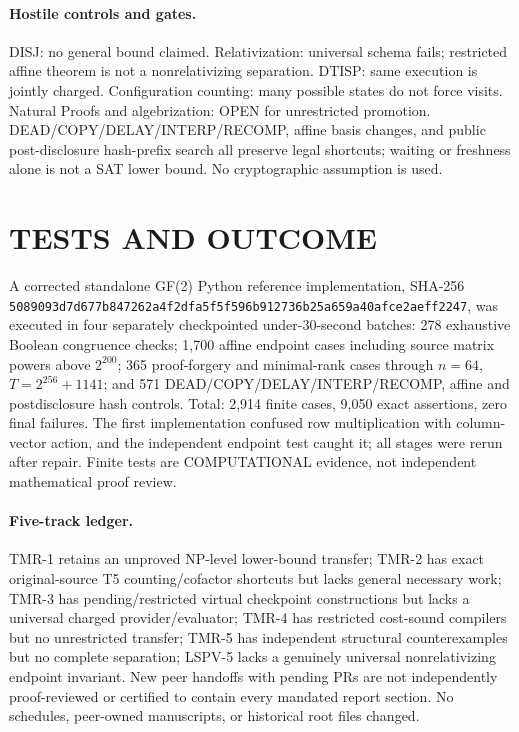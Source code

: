 \documentclass[11pt]{article}
\begin{document}
\paragraph{Hostile controls and gates.} DISJ: no general bound claimed. Relativization: universal schema fails; restricted affine theorem is not a nonrelativizing separation. DTISP: same execution is jointly charged. Configuration counting: many possible states do not force visits. Natural Proofs and algebrization: OPEN for unrestricted promotion. DEAD/COPY/DELAY/INTERP/RECOMP, affine basis changes, and public post-disclosure hash-prefix search all preserve legal shortcuts; waiting or freshness alone is not a SAT lower bound. No cryptographic assumption is used.

\section{TESTS AND OUTCOME}
A corrected standalone GF(2) Python reference implementation, SHA-256 \texttt{5089093d7d677b847262a4f2dfa5f5f596b912736b25a659a40afce2aeff2247}, was executed in four separately checkpointed under-30-second batches: 278 exhaustive Boolean congruence checks; 1,700 affine endpoint cases including source matrix powers above $2^{200}$; 365 proof-forgery and minimal-rank cases through $n=64$, $T=2^{256}+1141$; and 571 DEAD/COPY/DELAY/INTERP/RECOMP, affine and postdisclosure hash controls. Total: 2,914 finite cases, 9,050 exact assertions, zero final failures. The first implementation confused row multiplication with column-vector action, and the independent endpoint test caught it; all stages were rerun after repair. Finite tests are COMPUTATIONAL evidence, not independent mathematical proof review.
\paragraph{Five-track ledger.} TMR-1 retains an unproved NP-level lower-bound transfer; TMR-2 has exact original-source T5 counting/cofactor shortcuts but lacks general necessary work; TMR-3 has pending/restricted virtual checkpoint constructions but lacks a universal charged provider/evaluator; TMR-4 has restricted cost-sound compilers but no unrestricted transfer; TMR-5 has independent structural counterexamples but no complete separation; LSPV-5 lacks a genuinely universal nonrelativizing endpoint invariant. New peer handoffs with pending PRs are not independently proof-reviewed or certified to contain every mandated report section. No schedules, peer-owned manuscripts, or historical root files changed.
\end{document}
